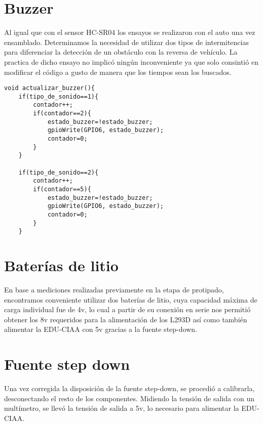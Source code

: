 \section{Buzzer}

Al igual que con el sensor HC-SR04 los ensayos se realizaron con el auto
una vez ensamblado. Determinamos la necesidad de utilizar dos tipos de
intermitencias para diferenciar la detección de un obstáculo con la
reversa de vehículo. La practica de dicho ensayo no implicó ningún
inconveniente ya que solo consintió en modificar el código a gusto de
manera que los tiempos sean los buscados.

\begin{lstlisting}
void actualizar_buzzer(){
    if(tipo_de_sonido==1){
        contador++;
        if(contador==2){
            estado_buzzer=!estado_buzzer;
            gpioWrite(GPIO6, estado_buzzer);
            contador=0;
        }
    }

    if(tipo_de_sonido==2){
        contador++;
        if(contador==5){
            estado_buzzer=!estado_buzzer;
            gpioWrite(GPIO6, estado_buzzer);
            contador=0;
        }
    }
\end{lstlisting}

\section{Baterías de litio}

En base a mediciones realizadas previamente en la etapa de protipado,
encontramos conveniente utilizar dos baterías de litio, cuya capacidad
máxima de carga individual fue de 4v, lo cual a partir de su conexión en
serie nos permitió obtener los 8v requeridos para la alimentación de los
L293D así como también alimentar la EDU-CIAA con 5v gracias a la fuente
step-down.

\section{Fuente step down}

Una vez corregida la disposición de la fuente step-down, se procedió a
calibrarla, desconectando el resto de los componentes. Midiendo la
tensión de salida con un multímetro, se llevó la tensión de salida a 5v,
lo necesario para alimentar la EDU-CIAA.
